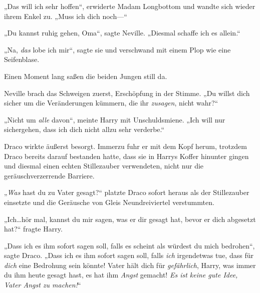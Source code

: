 „Das will ich sehr hoffen“, erwiderte Madam Longbottom und wandte sich wieder ihrem Enkel zu. „Muss ich dich noch—“

„Du kannst ruhig gehen, Oma“, sagte Neville. „Diesmal schaffe ich es allein.“

„Na, \emph{das} lobe ich mir“, sagte sie und verschwand mit einem Plop wie eine Seifenblase.

Einen Moment lang saßen die beiden Jungen still da.

Neville brach das Schweigen zuerst, Erschöpfung in der Stimme. „Du willst dich sicher um die Veränderungen kümmern, die ihr \emph{zusagen}, nicht wahr?“

„Nicht um \emph{alle} davon“, meinte Harry mit Unschuldsmiene. „Ich will nur sichergehen, dass ich dich nicht allzu sehr verderbe.“

\later

Draco wirkte äußerst besorgt. Immerzu fuhr er mit dem Kopf herum, trotzdem Draco bereits darauf bestanden hatte, dass sie in Harrys Koffer hinunter gingen und diesmal einen echten Stillezauber verwendeten, nicht nur die geräuschverzerrende Barriere.

„\emph{Was} hast du zu Vater gesagt?“ platzte Draco sofort heraus als der Stillezauber einsetzte und die Geräusche von Gleis Neundreiviertel verstummten.

„Ich…hör mal, kannst du mir sagen, was er dir gesagt hat, bevor er dich abgesetzt hat?“ fragte Harry.

„Dass ich es ihm sofort sagen soll, falls es scheint als würdest du mich bedrohen“, sagte Draco. „Dass ich es ihm sofort sagen soll, falls \emph{ich} irgendetwas tue, dass für \emph{dich} eine Bedrohung sein könnte! Vater hält dich für \emph{gefährlich}, Harry, was immer du ihm heute gesagt hast, es hat ihm \emph{Angst} gemacht! \emph{Es ist keine gute Idee, Vater Angst zu machen!}“

